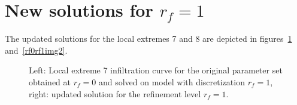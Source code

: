 \documentclass[review,times,3p,10pt]{elsarticle}
\begin{document}
% 
% 
% 
% 
% 
% 
\section{New solutions for $r_f=1$}

The updated solutions for the local extremes 7 and 8 are depicted in figures~\ref{rf0rf1img1} and~\ref{rf0rf1img2}.

\begin{figure}
\label{rf0rf1img1}
\caption{Left: Local extreme 7 infiltration curve for the original parameter set obtained at $r_f=0$ and solved on model with discretization $r_f=1$, right: updated solution for the refinement level $r_f=1$.}
\end{figure}
\end{document}
